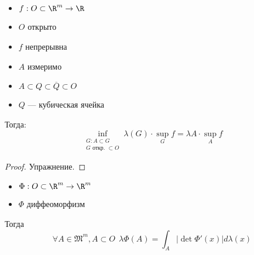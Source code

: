 \begin{lemma}\itemfix
    \label{лемма без имени}
    \begin{itemize}
        \item \(f : O \subset \R^m \to \R\)
        \item \(O\) открыто
        \item \(f\) непрерывна
        \item \(A\) измеримо
        \item \(A \subset Q \subset \overline Q \subset O\)
        \item \(Q\) --- кубическая ячейка
    \end{itemize}

    Тогда:
    \[\inf_{\substack{G : A\subset G \\ G \text{ откр. } \subset O}} \lambda(G) \cdot \sup_G f = \lambda A \cdot \sup_A f\]
\end{lemma}
\begin{proof}
    Упражнение. %
\end{proof}

\begin{theorem}\itemfix
    \label{мера лебега при диффеоморфизме}
    \begin{itemize}
        \item \(\Phi : O\subset \R^m \to \R^m\)
        \item \(\Phi\) диффеоморфизм
    \end{itemize}

    Тогда
    \[\forall A\in \mathfrak{M}^m, A \subset O \ \ \lambda \Phi(A) = \int_A |\det \Phi'(x)| d\lambda(x)\]
\end{theorem}

